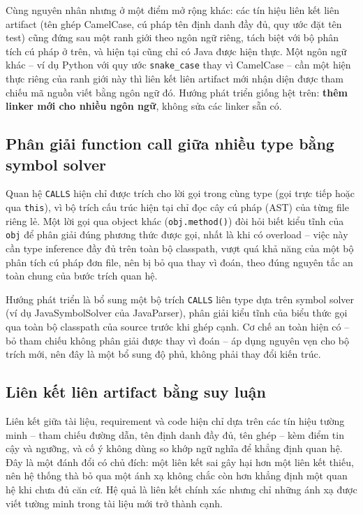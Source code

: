 Cùng nguyên nhân nhưng ở một điểm mở rộng khác: các tín hiệu liên kết liên artifact (tên ghép CamelCase, cú pháp tên định danh đầy đủ, quy ước đặt tên test) cũng đứng sau một ranh giới theo ngôn ngữ riêng, tách biệt với bộ phân tích cú pháp ở trên, và hiện tại cũng chỉ có Java được hiện thực. Một ngôn ngữ khác -- ví dụ Python với quy ước \texttt{snake\_case} thay vì CamelCase -- cần một hiện thực riêng của ranh giới này thì liên kết liên artifact mới nhận diện được tham chiếu mã nguồn viết bằng ngôn ngữ đó. Hướng phát triển giống hệt trên: \textbf{thêm linker mới cho nhiều ngôn ngữ}, không sửa các linker sẵn có.

\subsection{Phân giải function call giữa nhiều type bằng symbol solver}

Quan hệ \texttt{CALLS} hiện chỉ được trích cho lời gọi trong cùng type (gọi trực tiếp hoặc qua \texttt{this}), vì bộ trích cấu trúc hiện tại chỉ đọc cây cú pháp (AST) của từng file riêng lẻ. Một lời gọi qua object khác (\texttt{obj.method()}) đòi hỏi biết kiểu tĩnh của \texttt{obj} để phân giải đúng phương thức được gọi, nhất là khi có overload -- việc này cần type inference đầy đủ trên toàn bộ classpath, vượt quá khả năng của một bộ phân tích cú pháp đơn file, nên bị bỏ qua thay vì đoán, theo đúng nguyên tắc an toàn chung của bước trích quan hệ.

Hướng phát triển là bổ sung một bộ trích \texttt{CALLS} liên type dựa trên symbol solver (ví dụ JavaSymbolSolver của JavaParser), phân giải kiểu tĩnh của biểu thức gọi qua toàn bộ classpath của source trước khi ghép cạnh. Cơ chế an toàn hiện có -- bỏ tham chiếu không phân giải được thay vì đoán -- áp dụng nguyên vẹn cho bộ trích mới, nên đây là một bổ sung độ phủ, không phải thay đổi kiến trúc.

\subsection{Liên kết liên artifact bằng suy luận}

Liên kết giữa tài liệu, requirement và code hiện chỉ dựa trên các tín hiệu tường minh -- tham chiếu đường dẫn, tên định danh đầy đủ, tên ghép -- kèm điểm tin cậy và ngưỡng, và cố ý không dùng so khớp ngữ nghĩa để khẳng định quan hệ. Đây là một đánh đổi có chủ đích: một liên kết sai gây hại hơn một liên kết thiếu, nên hệ thống thà bỏ qua một ánh xạ không chắc còn hơn khẳng định một quan hệ khi chưa đủ căn cứ. Hệ quả là liên kết chính xác nhưng chỉ những ánh xạ được viết tường minh trong tài liệu mới trở thành cạnh.

